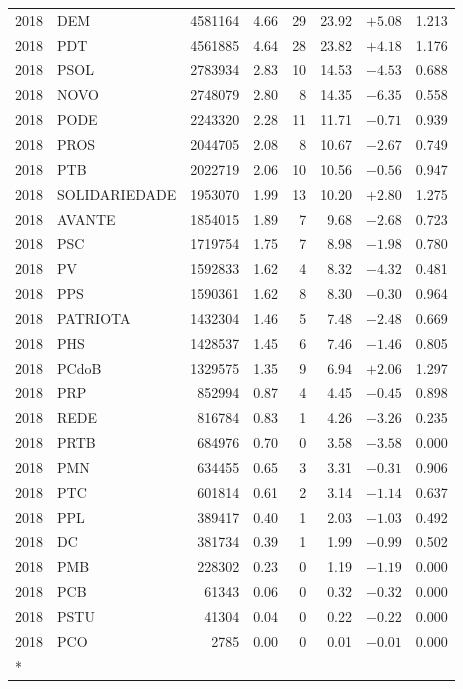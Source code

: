 \begin{longtable}{@{}llrrrrrr@{}}
2018 & DEM & 4581164 & 4.66 & 29 & 23.92 & \(+5.08\) & 1.213 \\
2018 & PDT & 4561885 & 4.64 & 28 & 23.82 & \(+4.18\) & 1.176 \\
2018 & PSOL & 2783934 & 2.83 & 10 & 14.53 & \(-4.53\) & 0.688 \\
2018 & NOVO & 2748079 & 2.80 & 8 & 14.35 & \(-6.35\) & 0.558 \\
2018 & PODE & 2243320 & 2.28 & 11 & 11.71 & \(-0.71\) & 0.939 \\
2018 & PROS & 2044705 & 2.08 & 8 & 10.67 & \(-2.67\) & 0.749 \\
2018 & PTB & 2022719 & 2.06 & 10 & 10.56 & \(-0.56\) & 0.947 \\
2018 & SOLIDARIEDADE & 1953070 & 1.99 & 13 & 10.20 & \(+2.80\) & 1.275 \\
2018 & AVANTE & 1854015 & 1.89 & 7 & 9.68 & \(-2.68\) & 0.723 \\
2018 & PSC & 1719754 & 1.75 & 7 & 8.98 & \(-1.98\) & 0.780 \\
2018 & PV & 1592833 & 1.62 & 4 & 8.32 & \(-4.32\) & 0.481 \\
2018 & PPS & 1590361 & 1.62 & 8 & 8.30 & \(-0.30\) & 0.964 \\
2018 & PATRIOTA & 1432304 & 1.46 & 5 & 7.48 & \(-2.48\) & 0.669 \\
2018 & PHS & 1428537 & 1.45 & 6 & 7.46 & \(-1.46\) & 0.805 \\
2018 & PCdoB & 1329575 & 1.35 & 9 & 6.94 & \(+2.06\) & 1.297 \\
2018 & PRP & 852994 & 0.87 & 4 & 4.45 & \(-0.45\) & 0.898 \\
2018 & REDE & 816784 & 0.83 & 1 & 4.26 & \(-3.26\) & 0.235 \\
2018 & PRTB & 684976 & 0.70 & 0 & 3.58 & \(-3.58\) & 0.000 \\
2018 & PMN & 634455 & 0.65 & 3 & 3.31 & \(-0.31\) & 0.906 \\
2018 & PTC & 601814 & 0.61 & 2 & 3.14 & \(-1.14\) & 0.637 \\
2018 & PPL & 389417 & 0.40 & 1 & 2.03 & \(-1.03\) & 0.492 \\
2018 & DC & 381734 & 0.39 & 1 & 1.99 & \(-0.99\) & 0.502 \\
2018 & PMB & 228302 & 0.23 & 0 & 1.19 & \(-1.19\) & 0.000 \\
2018 & PCB & 61343 & 0.06 & 0 & 0.32 & \(-0.32\) & 0.000 \\
2018 & PSTU & 41304 & 0.04 & 0 & 0.22 & \(-0.22\) & 0.000 \\
2018 & PCO & 2785 & 0.00 & 0 & 0.01 & \(-0.01\) & 0.000 \\*

\end{longtable}
